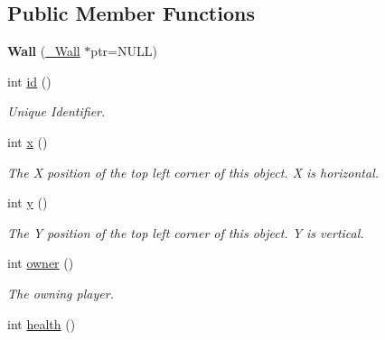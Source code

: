 \subsection*{Public Member Functions}
\begin{DoxyCompactItemize}
\item 
\hypertarget{classWall_acbe8536be394e99f06a2d308c394d29d}{
{\bfseries Wall} (\hyperlink{struct__Wall}{\_\-Wall} $\ast$ptr=NULL)}
\label{classWall_acbe8536be394e99f06a2d308c394d29d}

\item 
\hypertarget{classWall_ad77bee6e20ca7c6979400fac6df22773}{
int \hyperlink{classWall_ad77bee6e20ca7c6979400fac6df22773}{id} ()}
\label{classWall_ad77bee6e20ca7c6979400fac6df22773}

\begin{DoxyCompactList}\small\item\em Unique Identifier. \item\end{DoxyCompactList}\item 
\hypertarget{classWall_af8bc6cd9cdc739eb990600b365db41bc}{
int \hyperlink{classWall_af8bc6cd9cdc739eb990600b365db41bc}{x} ()}
\label{classWall_af8bc6cd9cdc739eb990600b365db41bc}

\begin{DoxyCompactList}\small\item\em The X position of the top left corner of this object. X is horizontal. \item\end{DoxyCompactList}\item 
\hypertarget{classWall_aae93d1657e1fa8de7a04dda4882028c0}{
int \hyperlink{classWall_aae93d1657e1fa8de7a04dda4882028c0}{y} ()}
\label{classWall_aae93d1657e1fa8de7a04dda4882028c0}

\begin{DoxyCompactList}\small\item\em The Y position of the top left corner of this object. Y is vertical. \item\end{DoxyCompactList}\item 
\hypertarget{classWall_a7368d56ff031197c351d3eb3293e6cbc}{
int \hyperlink{classWall_a7368d56ff031197c351d3eb3293e6cbc}{owner} ()}
\label{classWall_a7368d56ff031197c351d3eb3293e6cbc}

\begin{DoxyCompactList}\small\item\em The owning player. \item\end{DoxyCompactList}\item 
\hypertarget{classWall_aa12d1a474f8960e3f6062af6e1605345}{
int \hyperlink{classWall_aa12d1a474f8960e3f6062af6e1605345}{health} ()}
\label{classWall_aa12d1a474f8960e3f6062af6e1605345}


\end{DoxyCompactItemize}
